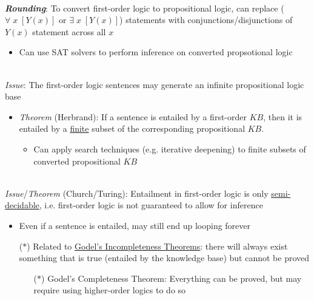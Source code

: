 \documentclass[12pt]{extarticle}
\theoremstyle{definition}
\theoremstyle{remark}
\newcommand{\pstart}[0]{\noindent}
\newcommand{\newp}[0]{~\\ \pstart}
\newcommand{\term}[1]{\noindent\textbf{\textit{#1}}}
\begin{document}
\newp
\term{Rounding}: To convert first-order logic to propositional logic, can replace ($\forall\;x\;[Y(x)]$ or $\exists\;x\;[Y(x)]$) statements with conjunctions/disjunctions of $Y(x)$ statement across all $x$ \begin{itemize}
    \item Can use SAT solvers to perform inference on converted propsotional logic
\end{itemize}

\newp
\textit{Issue}: The first-order logic sentences may generate an infinite propositional logic base \begin{itemize}
    \item \textit{Theorem} (Herbrand): If a sentence is entailed by a first-order $KB$, then it is entailed by a \ul{finite} subset of the corresponding propositional $KB$. \begin{itemize}
        \item Can apply search techniques (e.g. iterative deepening) to finite subsets of converted propositional $KB$
    \end{itemize}
\end{itemize}

\newp
\textit{Issue}/\textit{Theorem} (Church/Turing): Entailment in first-order logic is only \ul{semi-decidable}, i.e. first-order logic is not guaranteed to allow for inference \begin{itemize}
    \item Even if a sentence is entailed, may still end up looping forever
    \item[($\ast$)] Related to \ul{Godel's Incompleteness Theorems}: there will always exist something that is true (entailed by the knowledge base) but cannot be proved \begin{itemize}
        \item[($\ast$)] Godel's Completeness Theorem: Everything can be proved, but may require using higher-order logics to do so
    \end{itemize}
\end{itemize}
\end{document}
